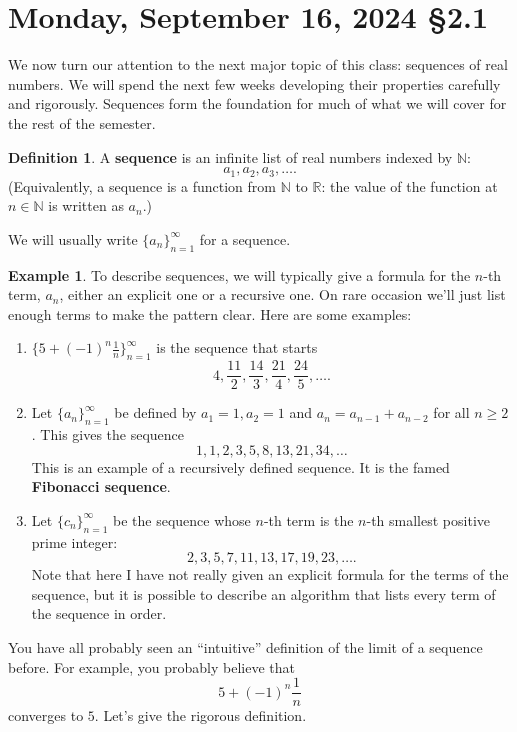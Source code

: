 \documentclass[12pt]{amsart}
\def\Mo{Monday}
\newcommand{\R}{{\mathbb{R}}}
\newcommand{\N}{\mathbb{N}}
\numberwithin{equation}{section}
\theoremstyle{plain} %
\newcommand{\Sept}[3]{\section{#2, September #1, 2024 \quad \S#3}}
\theoremstyle{definition}
\newtheorem{defn}[equation]{Definition}
\newtheorem{ex}[equation]{Example}
\theoremstyle{remark}
\begin{document}
\newpage

\Sept{16}{\Mo}{2.1}




We now turn our attention to the next major topic of this class: sequences of real numbers. We will spend the next few weeks developing their properties carefully and
rigorously. Sequences form the foundation for much of what we will cover for the rest of the semester. 


\begin{defn} A {\bf sequence} is an infinite list of real numbers indexed by $\N$:
$$
a_1, a_2, a_3, \dots.
$$
(Equivalently, a sequence is a function from $\N$ to $\R$: the value of the function at $n \in \N$ is written as $a_n$.)

We will usually write $\{a_n\}_{n=1}^\infty$ for a sequence.
\end{defn}

\begin{ex} To describe sequences, we will typically give a formula for the $n$-th term, $a_n$, either an explicit one or a recursive one. On rare occasion we'll
  just list enough terms to make the pattern clear. Here are some examples:
\begin{enumerate}

\item $\{5 + (-1)^n \frac{1}{n}\}_{n=1}^\infty$ is the sequence that starts
$$
4, \frac{11}2,  \frac{14}{3}, \frac{21}4, \frac{24}5, \dots.
$$

\item Let $\{a_n\}_{n=1}^\infty$ be defined by $a_1 = 1, a_2 = 1$ and $a_n = a_{n-1} + a_{n-2}$ for all $n \geq 2$. This gives the sequence
$$
1, 1, 2, 3, 5, 8, 13, 21, 34, \dots
$$
This is an example of a recursively defined sequence. It is the famed {\bf Fibonacci sequence}. 

\item Let $\{c_n\}_{n=1}^\infty$ be the sequence whose $n$-th term is the $n$-th smallest positive prime integer:
$$
2, 3, 5, 7, 11, 13, 17, 19, 23, \dots.
$$
Note that here I have not really given an explicit formula for the terms of the sequence, but it is possible to describe an algorithm that lists every term of the sequence in
order.
\end{enumerate}

\end{ex}


You have all probably seen an ``intuitive'' definition of the limit of a sequence before. For example, you probably believe that
$$
5 + (-1)^n \frac{1}{n}
$$
converges to $5$.
Let's give the rigorous definition.
\end{document}
